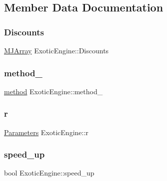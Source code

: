 \subsection{Member Data Documentation}
\hypertarget{classExoticEngine_acb40f9478cb8d11947bf2052e5ebea0c}{}\label{classExoticEngine_acb40f9478cb8d11947bf2052e5ebea0c} 
\subsubsection{\texorpdfstring{Discounts}{Discounts}}
{\footnotesize\ttfamily \hyperlink{classMJArray}{M\+J\+Array} Exotic\+Engine\+::\+Discounts\hspace{0.3cm}{\ttfamily [protected]}}

\hypertarget{classExoticEngine_aa0046882f659ebb2e5efa29e28a28c20}{}\label{classExoticEngine_aa0046882f659ebb2e5efa29e28a28c20} 
\subsubsection{\texorpdfstring{method\+\_\+}{method\_}}
{\footnotesize\ttfamily \hyperlink{PathDependent_8h_abed946c62f140eb7ff2ac742e6ad9497}{method} Exotic\+Engine\+::method\+\_\+\hspace{0.3cm}{\ttfamily [protected]}}

\hypertarget{classExoticEngine_a8efb47da1329445047b7d041bf9c4d7b}{}\label{classExoticEngine_a8efb47da1329445047b7d041bf9c4d7b} 
\subsubsection{\texorpdfstring{r}{r}}
{\footnotesize\ttfamily \hyperlink{classParameters}{Parameters} Exotic\+Engine\+::r\hspace{0.3cm}{\ttfamily [protected]}}

\hypertarget{classExoticEngine_a2a770397b5cb3f352bcd4a7834883607}{}\label{classExoticEngine_a2a770397b5cb3f352bcd4a7834883607} 
\subsubsection{\texorpdfstring{speed\+\_\+up}{speed\_up}}
{\footnotesize\ttfamily bool Exotic\+Engine\+::speed\+\_\+up\hspace{0.3cm}{\ttfamily [protected]}}

